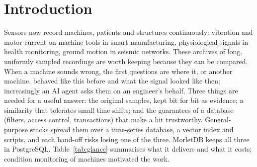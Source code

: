 \documentclass[sigconf]{acmart}
\newcommand{\M}{MorletDB}
\begin{document}
\section{Introduction}
Sensors now record machines, patients and structures continuously: vibration and motor current on machine tools in smart manufacturing, physiological signals in health monitoring, ground motion in seismic networks. These archives of long, uniformly sampled recordings are worth keeping because they can be compared. When a machine sounds wrong, the first questions are where it, or another machine, behaved like this before and what the signal looked like then; increasingly an AI agent asks them on an engineer's behalf. Three things are needed for a useful answer: the original samples, kept bit for bit as evidence; a similarity that tolerates small time shifts; and the guarantees of a database (filters, access control, transactions) that make a hit trustworthy. General-purpose stacks spread them over a time-series database, a vector index and scripts, and each hand-off risks losing one of the three. \M{} keeps all three in PostgreSQL. Table~\ref{tab:glance} summarises what it delivers and what it costs; condition monitoring of machines motivated the work.
\end{document}
